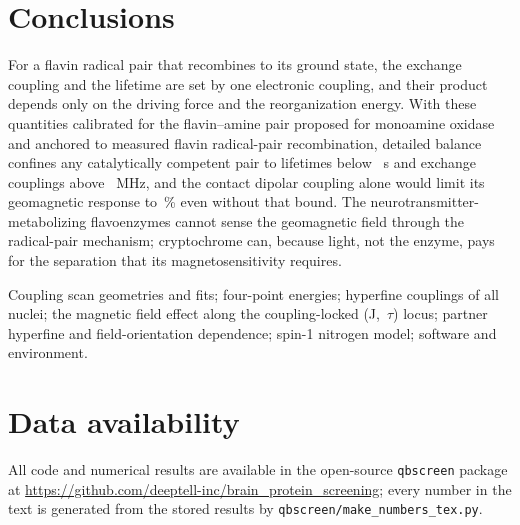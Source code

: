 \documentclass[journal=jpcbfk,manuscript=article,layout=traditional]{achemso}
\begin{document}
\section{Conclusions}

For a flavin radical pair that recombines to its ground state, the exchange
coupling and the lifetime are set by one electronic coupling, and their product
depends only on the driving force and the reorganization energy. With these
quantities calibrated for the flavin--amine pair proposed for monoamine oxidase
and anchored to measured flavin radical-pair recombination, detailed balance
confines any catalytically competent pair to lifetimes below
\tauCompMax~s and exchange couplings above \JCompMin~MHz, and the contact
dipolar coupling alone would limit its geomagnetic response to \capMAOspin\,\%
even without that bound. The
neurotransmitter-metabolizing flavoenzymes cannot sense the geomagnetic field
through the radical-pair mechanism; cryptochrome can, because light, not the
enzyme, pays for the separation that its magnetosensitivity requires.

\begin{table}
\caption{Upper bound $\Delta_{\max}$ on the driving force for a radical pair
that forms thermally at the rate $k_{\rm cat} = 10$~s$^{-1}$, with the lifetime
and exchange coupling at the bound. The full grid ($k_{\rm cat}=1$--100~s$^{-1}$)
is in the Supporting Information.}
\label{tab:competence}

\end{table}

\begin{suppinfo}
Coupling scan geometries and fits; four-point energies; hyperfine couplings of all
nuclei; the magnetic field effect along the coupling-locked (J,~$\tau$) locus;
partner hyperfine and field-orientation dependence; spin-1 nitrogen model;
software and environment.
\end{suppinfo}

\section*{Data availability}
All code and numerical results are available in the open-source \texttt{qbscreen}
package at \url{https://github.com/deeptell-inc/brain_protein_screening}; every
number in the text is generated from the stored results by
\texttt{qbscreen/make\_numbers\_tex.py}.


\end{document}
